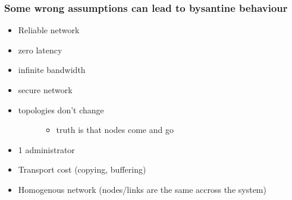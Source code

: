 \documentclass[letterpaper,10pt,english]{sphinxmanual}
\begin{document}
\subsubsection{Some wrong assumptions can lead to bysantine behaviour}
\label{\detokenize{google_article:some-wrong-assumptions-can-lead-to-bysantine-behaviour}}\begin{itemize}
\item {} 
Reliable network

\item {} 
zero latency

\item {} 
infinite bandwidth

\item {} 
secure network

\item {} \begin{description}
\item[{topologies don’t change}] \leavevmode\begin{itemize}
\item {} 
truth is that nodes come and go

\end{itemize}

\end{description}

\item {} 
1 administrator

\item {} 
Transport cost (copying, buffering)

\item {} 
Homogenous network (nodes/links are the same accross the system)

\end{itemize}
\end{document}

